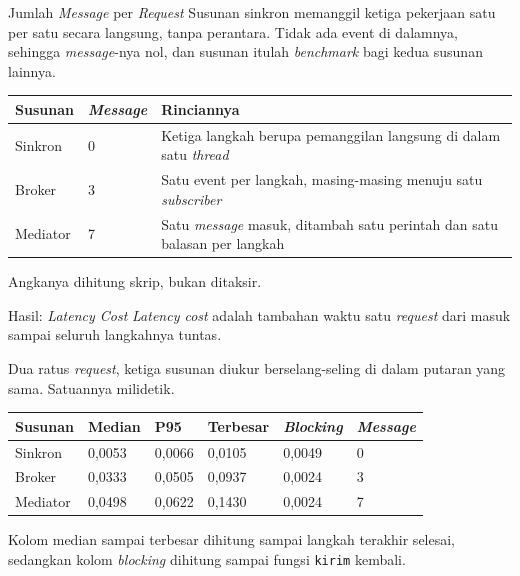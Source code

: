 \documentclass[aspectratio=169, table, 12pt]{beamer}
\begin{document}
\begin{frame}{{\Large Jumlah \textit{Message} per \textit{Request}}}
  \vspace{8pt}
  {\small Susunan sinkron memanggil ketiga pekerjaan satu per satu secara
  langsung, tanpa perantara. Tidak ada event di dalamnya, sehingga
  \textit{message}-nya nol, dan susunan itulah \textit{benchmark} bagi kedua
  susunan lainnya.}

  \vspace{6pt}
  \centering
  \small
  \begin{tabularx}{0.96\textwidth}{|l|l|X|}
    \hline
    \textbf{Susunan} & \textbf{\textit{Message}} & \textbf{Rinciannya} \\
    \hline
    Sinkron & 0 & Ketiga langkah berupa pemanggilan langsung di dalam satu \textit{thread} \\
    \hline
    Broker & 3 & Satu event per langkah, masing-masing menuju satu \textit{subscriber} \\
    \hline
    Mediator & 7 & Satu \textit{message} masuk, ditambah satu perintah dan satu balasan per langkah \\
    \hline
  \end{tabularx}

  \vspace{8pt}
  \raggedright
  {\small Angkanya dihitung skrip, bukan ditaksir.}
\end{frame}

\begin{frame}{{\Large Hasil: \textit{Latency Cost}}}
  \vspace{6pt}
  {\small \textit{Latency cost} adalah tambahan waktu satu \textit{request} dari
  masuk sampai seluruh langkahnya tuntas.}

  \vspace{4pt}
  {\small Dua ratus \textit{request}, ketiga susunan diukur berselang-seling di dalam
  putaran yang sama. Satuannya milidetik.}

  \vspace{6pt}
  \centering
  \small
  \begin{tabularx}{0.96\textwidth}{|l|l|l|l|l|X|}
    \hline
    \textbf{Susunan} & \textbf{Median} & \textbf{P95} & \textbf{Terbesar} & \textbf{\textit{Blocking}} & \textbf{\textit{Message}} \\
    \hline
    Sinkron & 0,0053 & 0,0066 & 0,0105 & 0,0049 & 0 \\
    \hline
    Broker & 0,0333 & 0,0505 & 0,0937 & 0,0024 & 3 \\
    \hline
    Mediator & 0,0498 & 0,0622 & 0,1430 & 0,0024 & 7 \\
    \hline
  \end{tabularx}

  \vspace{6pt}
  \raggedright
  {\small Kolom median sampai terbesar dihitung sampai langkah terakhir selesai,
  sedangkan kolom \textit{blocking} dihitung sampai fungsi \texttt{kirim} kembali.}
\end{frame}
\end{document}
